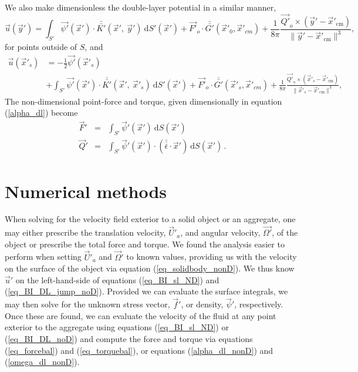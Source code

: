  We also make dimensionless the double-layer potential in a similar manner, 
 \begin{equation}
 \vec{u}(\vec{y}') = \int_{S'}
 \vec{\psi'}(\vec{x}') \cdot  \bar{\bar{K'}}(\vec{x}', \ \vec{y}')  \ \text{d}S' (\vec{x}') + \vec{F'}_o \cdot \bar{\bar{G'}}(\vec{x}'_{0},\vec{x}'_{cm})
 +\frac{1}{8 \pi} \frac{\vec{Q'}_o \times
 (\vec{y}'   - \vec{x}'_{\text{cm}} ) }{\| \vec{y}'   - \vec{x}'_{\text{cm}} \|^3 },
  \label{eq_BI_DL_noD}
 \end{equation}
 for points outside of $S$, and
 \begin{align}
 \vec{u}(\vec{x}'_s) 
 & =  -\frac{1}{2}\vec{\psi'}(\vec{x}'_s)
 \nonumber  \\
&+  \int_{S'}
 \vec{\psi'}(\vec{x}') \cdot  \bar{\bar{K'}}(\vec{x}', \ \vec{x}'_s)  \ \text{d}S' (\vec{x}') + \vec{F'}_o \cdot \bar{\bar{G'}}(\vec{x}'_{s},\vec{x}'_{cm})
 +\frac{1}{8 \pi} \frac{\vec{Q'}_o \times
 (\vec{x}'_s   - \vec{x}'_{\text{cm}} ) }{\| \vec{x}'_s   - \vec{x}'_{\text{cm}} \|^3 },
  \label{eq_BI_DL_jump_noD}
 \end{align}
 The non-dimensional point-force and torque, given dimensionally in equation (\ref{alpha_dl}) 
 become
 \begin{eqnarray}
  \vec{F}' &=&  \int_{S'}  \vec{\psi}'( \vec{x}') \ \text{d}S(\vec{x}')  
 \label{alpha_dl_nonD} \\
  \vec{Q}' &=&  \int_{S'}  \vec{\psi}'(\vec{x}')  \cdot  (\bar{\bar{\bar{\epsilon}}} \cdot \vec{x}' )  \ \text{d}S(\vec{x}') \, .
 \label{omega_dl_nonD}
 \end{eqnarray}

\section{Numerical methods}
\label{sec:numerical}
When solving for the velocity field exterior to a solid object or an aggregate, one may either 
prescribe the translation velocity,  $ \vec{U}'_a$, and angular velocity, $ \vec{\Omega'}$, of the object 
or prescribe 
the total force and torque. 
We found the analysis easier to perform when setting $\vec{U}'_a$ and $\vec{\Omega}'$ to known values, providing us with the velocity on the surface of the object via equation (\ref{eq_solidbody_nonD}). We thus know 
 $\vec{u}'$ on the left-hand-side of equations (\ref{eq_BI_sl_ND}) and (\ref{eq_BI_DL_jump_noD}). Provided we can evaluate the surface integrals, we may then solve for the unknown stress vector, $\vec{f}'$, or density, $\vec{\psi}'$, respectively. Once these are found, we can evaluate the velocity of the fluid at any point exterior to the aggregate using equations (\ref{eq_BI_sl_ND}) or (\ref{eq_BI_DL_noD}) and compute the force and torque via equations (\ref{eq_forcebal}) and (\ref{eq_torquebal}), or equations  (\ref{alpha_dl_nonD}) and (\ref{omega_dl_nonD}).

